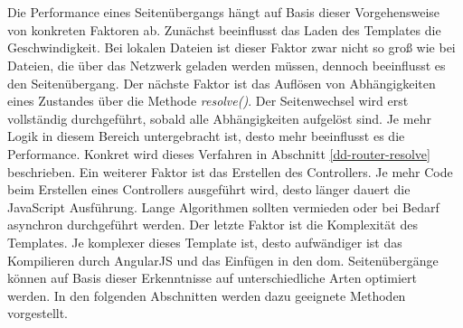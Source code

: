 \\\\
Die Performance eines Seitenübergangs hängt auf Basis dieser Vorgehensweise von konkreten Faktoren ab. Zunächst beeinflusst das Laden des Templates die Geschwindigkeit. Bei lokalen Dateien ist dieser Faktor zwar nicht so groß wie bei Dateien, die über das Netzwerk geladen werden müssen, dennoch beeinflusst es den Seitenübergang. Der nächste Faktor ist das Auflösen von Abhängigkeiten eines Zustandes über die Methode \emph{resolve()}. Der Seitenwechsel wird erst vollständig durchgeführt, sobald alle Abhängigkeiten aufgelöst sind. Je mehr Logik in diesem Bereich untergebracht ist, desto mehr beeinflusst es die Performance. Konkret wird dieses Verfahren in Abschnitt \ref{dd-router-resolve} beschrieben. Ein weiterer Faktor ist das Erstellen des Controllers. Je mehr Code beim Erstellen eines Controllers ausgeführt wird, desto länger dauert die JavaScript Ausführung. Lange Algorithmen sollten vermieden oder bei Bedarf asynchron durchgeführt werden. Der letzte Faktor ist die Komplexität des Templates. Je komplexer dieses Template ist, desto aufwändiger ist das Kompilieren durch AngularJS und das Einfügen in den \gls{dom}. Seitenübergänge können auf Basis dieser Erkenntnisse auf unterschiedliche Arten optimiert werden. In den folgenden Abschnitten werden dazu geeignete Methoden vorgestellt.


